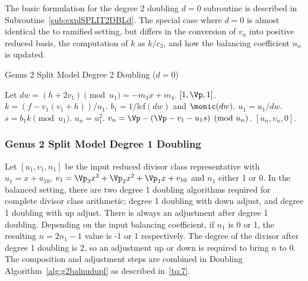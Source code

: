 The basic formulation for the degree 2 doubling $d = 0$ subroutine is described
in Subroutine~\ref{sub:explSPLIT2DBLd}. The special case where $d=0$ is almost
identical the to ramified setting, but differs in the conversion of $v_n$
into positive reduced basis, the computation of $k$ as $k/c_3$, and how the
balancing coefficient $n_n$ is updated. 

\begin{subroutine}[htbp]
\caption{Genus 2 Split Model Degree 2 Doubling ($d = 0$)\label{sub:explSPLIT2DBLd}}
\begin{algorithmic} [1]
\State Let $dw = (h + 2v_1) \pmod{u_1} = -m_3x + m_4.$
 \hspace{1pt} \Return $[1,\Vp,1]$.
\Else
    \State $k = (f - v_1(v_1 + h))/u_1$.
    \State $b_1 = 1/$lcf$(dw)$ and $\monic(dw)$.
    \State $u_1 = u_1/dw$.
    \State $s = b_1k \pmod{u_1}$.
    \State $u_n = u_1^2$.
    \State $v_n = \Vp - (\Vp - v_1 - u_1s) \pmod{u_n}$.
    \State \Return $[u_n,v_n,0]$.
\EndIf
\end{algorithmic}
\end{subroutine}
 




\subsubsection{Genus 2 Split Model Degree 1 Doubling}
Let $[u_1,v_1,n_1]$ be the input reduced divisor class representative with $u_1
= x + u_{10}$, $v_1 = \Vp_3x^3 + \Vp_2x^2 + \Vp_1x + v_{10}$ and $n_1$ either 1
or 0. In the balanced setting, there are two degree 1 doubling algorithms
required for complete divisor class arithmetic; degree 1 doubling with down
adjust, and degree 1 doubling with up adjust. There is always an adjustment
after degree 1 doubling. Depending on the input balancing coefficient, if $n_1$
is 0 or 1, the resulting $n = 2n_1 - 1$ value is -1 or 1 respectively. The
degree of the divisor after degree 1 doubling is 2, so an adjustment up or down
is required to bring $n$ to 0. The composition and adjustment steps are combined
in Doubling Algorithm~\ref{alg:g2balnudupl} as described in~\ref{tq:7}. 

